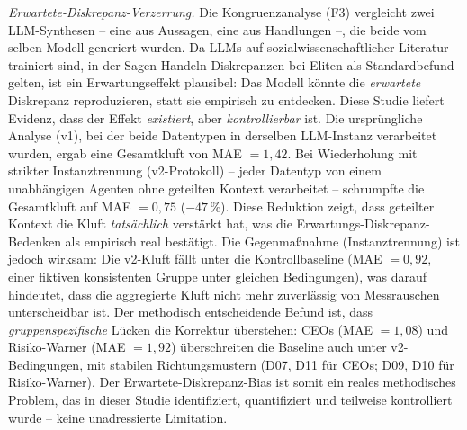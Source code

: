 \documentclass[12pt,a4paper]{article}
\begin{document}
\emph{Erwartete-Diskrepanz-Verzerrung.} Die Kongruenzanalyse (F3) vergleicht zwei LLM-Synthesen -- eine aus Aussagen, eine aus Handlungen --, die beide vom selben Modell generiert wurden. Da LLMs auf sozialwissenschaftlicher Literatur trainiert sind, in der Sagen-Handeln-Diskrepanzen bei Eliten als Standardbefund gelten, ist ein Erwartungseffekt plausibel: Das Modell könnte die \emph{erwartete} Diskrepanz reproduzieren, statt sie empirisch zu entdecken. Diese Studie liefert Evidenz, dass der Effekt \emph{existiert}, aber \emph{kontrollierbar} ist. Die ursprüngliche Analyse (v1), bei der beide Datentypen in derselben LLM-Instanz verarbeitet wurden, ergab eine Gesamtkluft von MAE $= 1{,}42$. Bei Wiederholung mit strikter Instanztrennung (v2-Protokoll) -- jeder Datentyp von einem unabhängigen Agenten ohne geteilten Kontext verarbeitet -- schrumpfte die Gesamtkluft auf MAE $= 0{,}75$ ($-47\,\%$). Diese Reduktion zeigt, dass geteilter Kontext die Kluft \emph{tatsächlich} verstärkt hat, was die Erwartungs-Diskrepanz-Bedenken als empirisch real bestätigt. Die Gegenmaßnahme (Instanztrennung) ist jedoch wirksam: Die v2-Kluft fällt unter die Kontrollbaseline (MAE $= 0{,}92$, einer fiktiven konsistenten Gruppe unter gleichen Bedingungen), was darauf hindeutet, dass die aggregierte Kluft nicht mehr zuverlässig von Messrauschen unterscheidbar ist. Der methodisch entscheidende Befund ist, dass \emph{gruppenspezifische} Lücken die Korrektur überstehen: CEOs (MAE $= 1{,}08$) und Risiko-Warner (MAE $= 1{,}92$) überschreiten die Baseline auch unter v2-Bedingungen, mit stabilen Richtungsmustern (D07, D11 für CEOs; D09, D10 für Risiko-Warner). Der Erwartete-Diskrepanz-Bias ist somit ein reales methodisches Problem, das in dieser Studie identifiziert, quantifiziert und teilweise kontrolliert wurde -- keine unadressierte Limitation.
\end{document}
